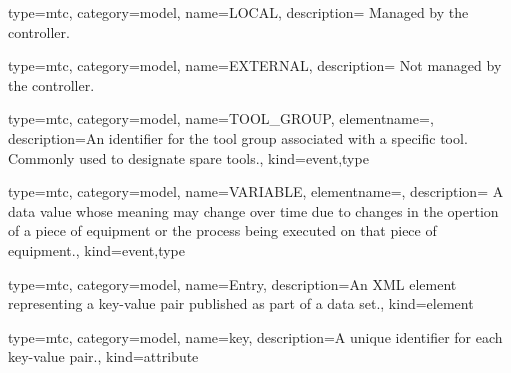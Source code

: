 {
  type=mtc,
  category=model,
  name={LOCAL},
  description={ Managed by the controller.}
}


{
  type=mtc,
  category=model,
  name={EXTERNAL},
  description={ Not managed by the controller.}
}


{
  type=mtc,
  category=model,
  name={TOOL\_GROUP},
  elementname=,
  description={An identifier for the tool group associated with a specific tool. Commonly used to designate spare tools.},
  kind={event,type}
}


{
  type=mtc,
  category=model,
  name={VARIABLE},
  elementname=,
  description={ A data value whose meaning may change over time due to changes in the opertion of a piece of equipment or the process being executed on that piece of equipment.},
  kind={event,type}
}


{
  type=mtc,
  category=model,
  name={Entry},
  description={An XML element representing a \gls{key-value pair} published as part of a \gls{data set}.},
  kind={element}
}

{
  type=mtc,
  category=model,
  name={key},
  description={A unique identifier for each \gls{key-value pair}.},
  kind={attribute}
}